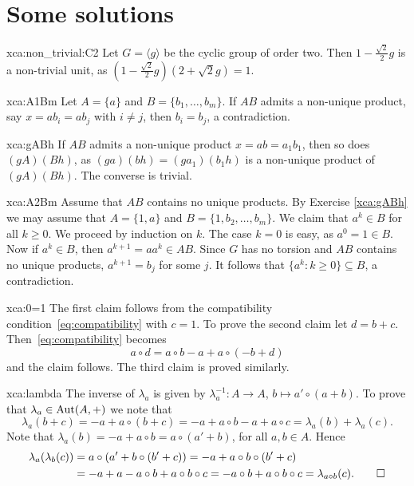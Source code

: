 \chapter*{Some solutions}

\pagestyle{plain}
\fancyhf{}
\fancyfoot[CE,CO]{\leftmark}
\fancyfoot[LE,RO]{\thepage}


\begin{sol}{xca:non_trivial:C2}
    Let $G=\langle g\rangle$ be the cyclic group of order two. 
    Then $1-\frac{\sqrt{2}}{2}g$ is a non-trivial unit, as 
    $\left(1-\frac{\sqrt{2}}{2}g\right)\left(2+\sqrt{2}g\right)=1$.
\end{sol}

\begin{sol}{xca:A1Bm}
    Let $A=\{a\}$ and $B=\{b_1,\dots,b_m\}$. 
    If $AB$ admits a non-unique product, say $x=ab_i=ab_j$ with $i\ne j$, 
    then $b_i=b_j$, a contradiction.
\end{sol}

\begin{sol}{xca:gABh}
    If $AB$ admits a non-unique product $x=ab=a_1b_1$, then so does $(gA)(Bh)$, as
    $(ga)(bh)=(ga_1)(b_1h)$ is a non-unique product of $(gA)(Bh)$. 
    The converse is trivial. 
\end{sol}

\begin{sol}{xca:A2Bm}
    Assume that $AB$ contains no unique products. 
    By Exercise \ref{xca:gABh} we may assume that $A=\{1,a\}$ and $B=\{1,b_2,\dots,b_m\}$. 
    We claim that $a^k\in B$ for all $k\geq0$. We proceed by induction on $k$. The case
    $k=0$ is easy, as $a^0=1\in B$. Now if $a^k\in B$, then $a^{k+1}=aa^{k}\in AB$. Since $G$ has no torsion and 
    $AB$ contains no unique products, 
    $a^{k+1}=b_j$ for some $j$. It follows that $\{a^k:k\geq0\}\subseteq B$, a contradiction. 
\end{sol}

\begin{sol}{xca:0=1}
The first claim follows from the compatibility condition~\eqref{eq:compatibility} with
$c=1$.  To prove the second claim let $d=b+c$.
Then~\eqref{eq:compatibility} becomes 
\[
	a\circ d =a\circ b-a+a\circ (-b+d)
\]
and the claim follows. The third claim is
proved similarly.
\end{sol}

\begin{sol}{xca:lambda}
The inverse of $\lambda_a$ is given by $\lambda^{-1}_a\colon A\to A$, $b\mapsto a'\circ (a+b)$. To prove
that $\lambda_a\in\operatorname{Aut}(A,+)$ we note that
\[
\lambda_a(b+c)=-a+a\circ(b+c)=-a+a\circ b-a+a\circ c=\lambda_a(b)+\lambda_a(c).
\]
Note that $\lambda_a(b)=-a+a\circ b=a\circ (a'+b)$, for all $a,b\in A$. Hence 
\begin{align*}
\lambda_a(\lambda_b(c))&=a\circ (a'+b\circ (b'+c))=-a+a\circ b\circ (b'+c)\\
&=-a+a-a\circ b+a\circ b\circ c=-a\circ b+a\circ b\circ c=\lambda_{a\circ b}(c).\qedhere    
\end{align*}
\end{sol}

